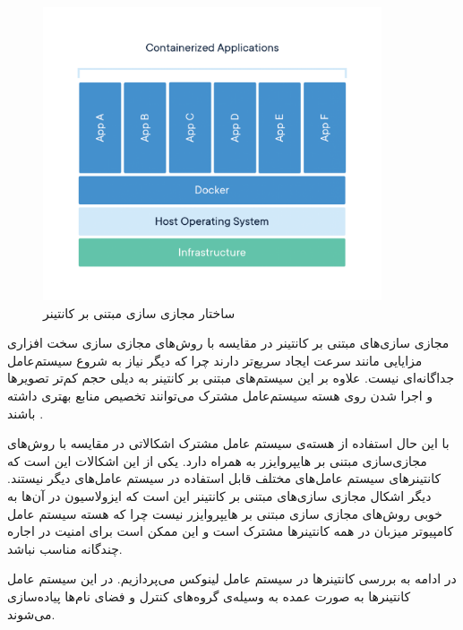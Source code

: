     \begin{figure}[]
      \centerline{\includegraphics[width=10cm]{graphics/chapter_2/container}}
      \caption{ساختار مجازی سازی مبتنی بر کانتینر \cite{2018are}}
      \label{fig:chapter_2:container}
    \end{figure}
    
    مجازی سازی‌های مبتنی بر کانتینر در مقایسه با روش‌های مجازی سازی سخت افزاری مزایایی مانند سرعت ایجاد سریع‌تر دارند چرا که دیگر نیاز به شروع سیستم‌عامل جداگانه‌ای نیست.
    علاوه بر این سیستم‌های مبتنی بر کانتینر به دیلی حجم کم‌تر  تصویر‌ها و اجرا شدن روی هسته سیستم‌عامل مشترک می‌توانند تخصیص منابع بهتری داشته باشند \cite{morabito2015hypervisors}.

    با این حال استفاده از هسته‌ی سیستم عامل مشترک اشکالاتی در مقایسه با روش‌های مجازی‌سازی مبتنی بر هایپروایزر به همراه دارد.
    یکی از این اشکالات این است که کانتینر‌های سیستم عامل‌های مختلف قابل استفاده در سیستم عامل‌های دیگر نیستند.
    دیگر اشکال مجازی سازی‌های مبتنی بر کانتینر این است که ایزولاسیون در آن‌ها به خوبی روش‌های مجازی سازی مبتنی بر هایپروایزر نیست \cite{bui2015analysis} چرا که هسته سیستم عامل کامپیوتر میزبان در همه کانتینر‌ها مشترک است و این ممکن است برای امنیت در اجاره چندگانه مناسب نباشد.

    در ادامه به بررسی کانتینر‌ها در سیستم عامل لینوکس می‌پردازیم.
    در این سیستم عامل کانتینر‌ها به صورت عمده به وسیله‌ی گروه‌های کنترل\cite{tejun2015Linux} و فضای نام‌ها\cite{2015Linux} پیاده‌سازی می‌شوند.

